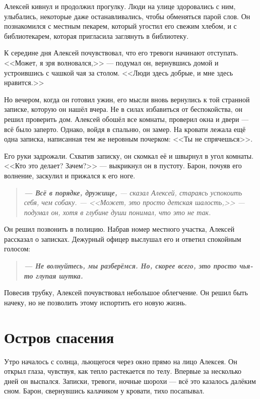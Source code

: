 \documentclass[12pt,a4paper]{book}
\newenvironment{dialogue}{\begin{quote}\itshape}{\end{quote}}
\begin{document}
Алексей кивнул и продолжил прогулку. Люди на улице здоровались с ним, улыбались, некоторые даже останавливались, чтобы обменяться парой слов. Он познакомился с местным пекарем, который угостил его свежим хлебом, и с библиотекарем, которая пригласила заглянуть в библиотеку.

К середине дня Алексей почувствовал, что его тревоги начинают отступать. <<Может, я зря волновался,>> --- подумал он, вернувшись домой и устроившись с чашкой чая за столом. <<Люди здесь добрые, и мне здесь нравится.>>

Но вечером, когда он готовил ужин, его мысли вновь вернулись к той странной записке, которую он нашёл вчера. Не в силах избавиться от беспокойства, он решил проверить дом. Алексей обошёл все комнаты, проверил окна и двери --- всё было заперто. Однако, войдя в спальню, он замер. На кровати лежала ещё одна записка, написанная тем же неровным почерком: <<Ты не спрячешься>>.

Его руки задрожали. Схватив записку, он скомкал её и швырнул в угол комнаты. <<Кто это делает? Зачем?>> --- выкрикнул он в пустоту. Барон, почуяв его волнение, заскулил и прижался к его ноге.

\begin{dialogue}
\textbf{--- Всё в порядке, дружище,} --- сказал Алексей, стараясь успокоить себя, чем собаку. --- <<Может, это просто детская шалость,>> --- подумал он, хотя в глубине души понимал, что это не так.
\end{dialogue}

Он решил позвонить в полицию. Набрав номер местного участка, Алексей рассказал о записках. Дежурный офицер выслушал его и ответил спокойным голосом:

\begin{dialogue}
\textbf{--- Не волнуйтесь, мы разберёмся. Но, скорее всего, это просто чья-то глупая шутка.}
\end{dialogue}

Повесив трубку, Алексей почувствовал небольшое облегчение. Он решил быть начеку, но не позволить этому испортить его новую жизнь.

\chapter{Остров спасения}

Утро началось с солнца, льющегося через окно прямо на лицо Алексея. Он открыл глаза, чувствуя, как тепло растекается по телу. Впервые за несколько дней он выспался. Записки, тревоги, ночные шорохи --- всё это казалось далёким сном. Барон, свернувшись калачиком у кровати, тихо посапывал.
\end{document}

